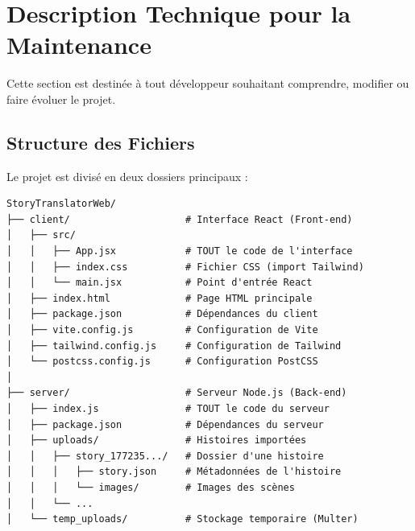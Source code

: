 \documentclass[12pt,twoside,letterpaper]{article}
\begin{document}
\newpage
\section{Description Technique pour la Maintenance}
Cette section est destinée à tout développeur souhaitant comprendre, modifier ou faire évoluer le projet.

\subsection{Structure des Fichiers}
Le projet est divisé en deux dossiers principaux :

\begin{verbatim}
StoryTranslatorWeb/
├── client/                    # Interface React (Front-end)
│   ├── src/
│   │   ├── App.jsx            # TOUT le code de l'interface
│   │   ├── index.css          # Fichier CSS (import Tailwind)
│   │   └── main.jsx           # Point d'entrée React
│   ├── index.html             # Page HTML principale
│   ├── package.json           # Dépendances du client
│   ├── vite.config.js         # Configuration de Vite
│   ├── tailwind.config.js     # Configuration de Tailwind
│   └── postcss.config.js      # Configuration PostCSS
│
├── server/                    # Serveur Node.js (Back-end)
│   ├── index.js               # TOUT le code du serveur
│   ├── package.json           # Dépendances du serveur
│   ├── uploads/               # Histoires importées
│   │   ├── story_177235.../   # Dossier d'une histoire
│   │   │   ├── story.json     # Métadonnées de l'histoire
│   │   │   └── images/        # Images des scènes
│   │   └── ...
│   └── temp_uploads/          # Stockage temporaire (Multer)
\end{verbatim}
\end{document}
